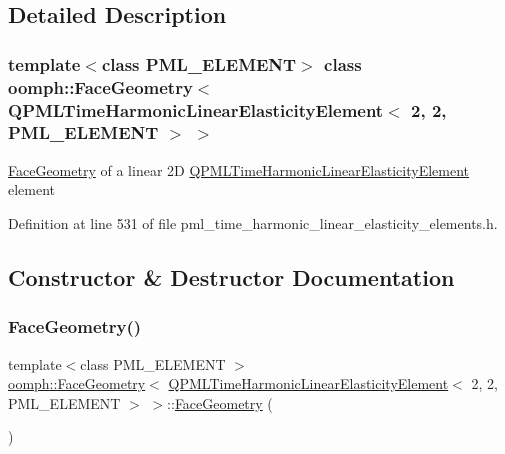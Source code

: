 \subsection{Detailed Description}
\subsubsection*{template$<$class P\+M\+L\+\_\+\+E\+L\+E\+M\+E\+NT$>$\newline
class oomph\+::\+Face\+Geometry$<$ Q\+P\+M\+L\+Time\+Harmonic\+Linear\+Elasticity\+Element$<$ 2, 2, P\+M\+L\+\_\+\+E\+L\+E\+M\+E\+N\+T $>$ $>$}

\hyperlink{classoomph_1_1FaceGeometry}{Face\+Geometry} of a linear 2D \hyperlink{classoomph_1_1QPMLTimeHarmonicLinearElasticityElement}{Q\+P\+M\+L\+Time\+Harmonic\+Linear\+Elasticity\+Element} element 

Definition at line 531 of file pml\+\_\+time\+\_\+harmonic\+\_\+linear\+\_\+elasticity\+\_\+elements.\+h.



\subsection{Constructor \& Destructor Documentation}
\mbox{\label{classoomph_1_1FaceGeometry_3_01QPMLTimeHarmonicLinearElasticityElement_3_012_00_012_00_01PML__ELEMENT_01_4_01_4_afa8ada06e11529717cf4e268813acf8f}} 
\subsubsection{\texorpdfstring{Face\+Geometry()}{FaceGeometry()}}
{\footnotesize\ttfamily template$<$class P\+M\+L\+\_\+\+E\+L\+E\+M\+E\+NT $>$ \\
\hyperlink{classoomph_1_1FaceGeometry}{oomph\+::\+Face\+Geometry}$<$ \hyperlink{classoomph_1_1QPMLTimeHarmonicLinearElasticityElement}{Q\+P\+M\+L\+Time\+Harmonic\+Linear\+Elasticity\+Element}$<$ 2, 2, P\+M\+L\+\_\+\+E\+L\+E\+M\+E\+NT $>$ $>$\+::\hyperlink{classoomph_1_1FaceGeometry}{Face\+Geometry} (\begin{DoxyParamCaption}{ }\end{DoxyParamCaption})\hspace{0.3cm}{\ttfamily [inline]}}



